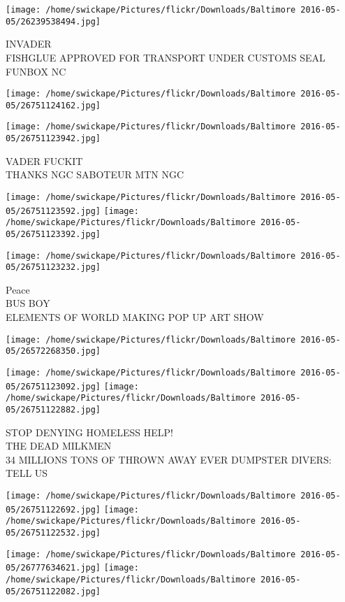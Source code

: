 \documentclass[10pt,letterpaper]{article}
\begin{document}
\texttt{[image: /home/swickape/Pictures/flickr/Downloads/Baltimore 2016-05-05/26239538494.jpg]}

INVADER\\
FISHGLUE APPROVED FOR TRANSPORT UNDER CUSTOMS SEAL\\
FUNBOX NC
\pagebreak

\texttt{[image: /home/swickape/Pictures/flickr/Downloads/Baltimore 2016-05-05/26751124162.jpg]}

\vspace{0.25in}
\texttt{[image: /home/swickape/Pictures/flickr/Downloads/Baltimore 2016-05-05/26751123942.jpg]}

VADER FUCKIT\\
THANKS NGC SABOTEUR MTN NGC
\pagebreak

\texttt{[image: /home/swickape/Pictures/flickr/Downloads/Baltimore 2016-05-05/26751123592.jpg]}
\texttt{[image: /home/swickape/Pictures/flickr/Downloads/Baltimore 2016-05-05/26751123392.jpg]}

\texttt{[image: /home/swickape/Pictures/flickr/Downloads/Baltimore 2016-05-05/26751123232.jpg]}

Peace\\
BUS BOY\\
ELEMENTS OF WORLD MAKING POP UP ART SHOW
\pagebreak

\texttt{[image: /home/swickape/Pictures/flickr/Downloads/Baltimore 2016-05-05/26572268350.jpg]}

\vspace{0.25in}
\texttt{[image: /home/swickape/Pictures/flickr/Downloads/Baltimore 2016-05-05/26751123092.jpg]}
\texttt{[image: /home/swickape/Pictures/flickr/Downloads/Baltimore 2016-05-05/26751122882.jpg]}

STOP DENYING HOMELESS HELP!\\
THE DEAD MILKMEN\\
34 MILLIONS TONS OF THROWN AWAY EVER DUMPSTER DIVERS: TELL US
\pagebreak

\texttt{[image: /home/swickape/Pictures/flickr/Downloads/Baltimore 2016-05-05/26751122692.jpg]}
\texttt{[image: /home/swickape/Pictures/flickr/Downloads/Baltimore 2016-05-05/26751122532.jpg]}

\texttt{[image: /home/swickape/Pictures/flickr/Downloads/Baltimore 2016-05-05/26777634621.jpg]}
\texttt{[image: /home/swickape/Pictures/flickr/Downloads/Baltimore 2016-05-05/26751122082.jpg]}
\end{document}
